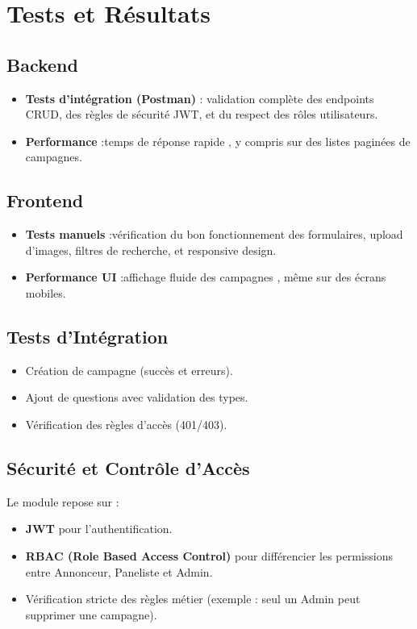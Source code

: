 \section{Tests et Résultats}

\subsection{Backend}
\begin{itemize}[label=\textbullet]

    \item \textbf{Tests d’intégration (Postman)} : \newline validation complète des endpoints CRUD, des règles de sécurité JWT, et du respect des rôles utilisateurs.
    \item \textbf{Performance} :\newline temps de réponse rapide , y compris sur des listes paginées de campagnes.
\end{itemize}

\subsection{Frontend}
\begin{itemize}[label=\textbullet]
    \item \textbf{Tests manuels} :\newline vérification du bon fonctionnement des formulaires, upload d’images, filtres de recherche, et responsive design.
    \item \textbf{Performance UI} :\newline affichage fluide des campagnes , même sur des écrans mobiles.
\end{itemize}
\subsection{Tests d’Intégration}
\begin{itemize}[label=\textbullet]
    \item Création de campagne (succès et erreurs).
    \item Ajout de questions avec validation des types.
    \item Vérification des règles d’accès (401/403).
\end{itemize}

\subsection{Sécurité et Contrôle d’Accès}
Le module repose sur :
\begin{itemize}[label=\textbullet]
    \item \textbf{JWT} pour l’authentification.
    \item \textbf{RBAC (Role Based Access Control)} pour différencier les permissions entre Annonceur, Paneliste et Admin.
    \item Vérification stricte des règles métier (exemple : seul un Admin peut supprimer une campagne).
\end{itemize}



